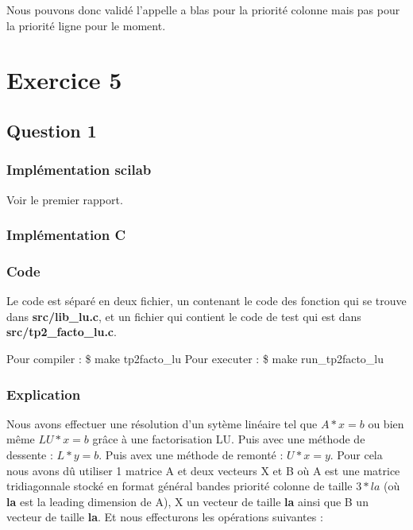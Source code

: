 \documentclass[11pt]{article}
\begin{document}
Nous pouvons donc validé l'appelle a blas pour la priorité colonne
mais pas pour la priorité ligne pour le moment.

\section{Exercice 5}

\subsection{Question 1}

\subsubsection{Implémentation scilab}

Voir le premier rapport.

\subsubsection{Implémentation C}

\subsubsection{Code}

Le code est séparé en deux fichier, un contenant le code des fonction
qui se trouve dans \textbf{src/lib\_lu.c}, et un fichier qui contient
le code de test qui est dans \textbf{src/tp2\_facto\_lu.c}.\newline

Pour compiler : \$ make tp2facto\_lu\newline
Pour executer : \$ make run\_tp2facto\_lu\newline

\subsubsection{Explication}

Nous avons effectuer une résolution d'un sytème linéaire tel que $A *
x = b$ ou bien même $LU * x = b $ grâce à une factorisation
LU.\newline
\vspace{5mm}
Puis avec une méthode de dessente : $ L * y = b $.\newline
Puis avex une méthode de remonté : $ U * x = y $.\newline
\vspace{5mm}
Pour cela nous avons dû utiliser 1 matrice A et deux vecteurs X et B
où A est une matrice tridiagonnale stocké en format général bandes 
priorité colonne de taille $3 * la$ (où \textbf{la} est la leading dimension de
A), X un vecteur de taille \textbf{la} ainsi que B un vecteur de
taille \textbf{la}.\newline
\vspace{5mm}
Et nous effecturons les opérations suivantes :
\end{document}
